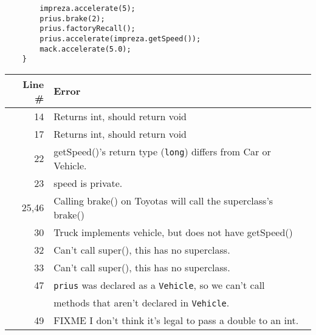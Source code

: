 \documentclass[11pt]{article}
\newenvironment{answer}{\large\lstset{basicstyle=\large}\color{white}}{}
\newenvironment{answer}{\large\lstset{basicstyle=\large}\color{red}}{}
\begin{document}
\begin{enumerate}
\begin{lstlisting}
		impreza.accelerate(5);
		prius.brake(2);
		prius.factoryRecall();
		prius.accelerate(impreza.getSpeed());
		mack.accelerate(5.0);
	}
\end{lstlisting}

    \begin{answer}
    \begin{tabular}{r l} %
    Line \# & Error \\\hline
    14  & Returns int, should return void\\
    17  & Returns int, should return void\\
    22  & getSpeed()'s return type ({\tt long}) differs from Car or Vehicle.\\
    23  & speed is private.\\
    25,46& Calling brake() on Toyotas will call the superclass's brake()\\
    30  & Truck implements vehicle, but does not have getSpeed()\\
    32  & Can't call super(), this has no superclass.\\
    33  & Can't call super(), this has no superclass.\\
    47  & {\tt prius} was declared as a {\tt Vehicle}, so we can't call\\
    ~   & methods that aren't declared in {\tt Vehicle}.\\
    49  & FIXME I don't think it's legal to pass a double to an int.
    \end{tabular}
    \end{answer}

\end{enumerate}
\end{document}
